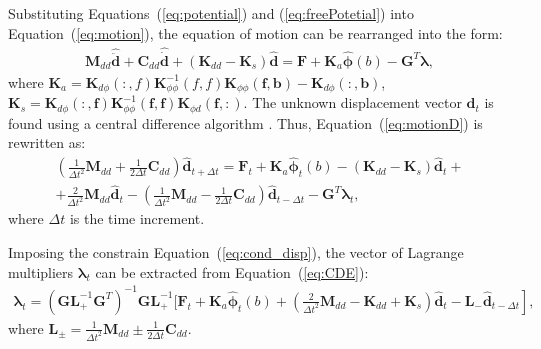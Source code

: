 \documentclass[sensors,article,accept,moreauthors,pdftex]{Definitions/mdpi}
\begin{document}
\begin{paracol}{2}
Substituting Equations~(\ref{eq:potential}) and (\ref{eq:freePotetial}) into Equation~(\ref{eq:motion}), the equation of motion can be rearranged into the form:
\begin{eqnarray}
\textbf{M}_{dd} \widehat{\ddot{\textbf{d}}} + \textbf{C}_{dd} \widehat{\dot{\textbf{d}}} + (\textbf{K}_{dd}-\textbf{K}_{s}) \widehat{\textbf{d}}  = \textbf{F} + \textbf{K}_{a} \widehat{\boldsymbol{\phi}}(b) - \textbf{G}^T \boldsymbol{\lambda},
\label{eq:motionD}
\end{eqnarray}
where  \(\textbf{K}_a=\textbf{K}_{d\phi}(:,f)\textbf{K}_{\phi \phi}^{-1}(f,f)\textbf{K}_{\phi \phi}(\textbf{f},\textbf{b})-\textbf{K}_{d\phi}(:,\textbf{b})\), \(\textbf{K}_s=\textbf{K}_{d \phi}(:,\textbf{f})\textbf{K}_{\phi \phi}^{-1}(\textbf{f},\textbf{f})\textbf{K}_{\phi d}(\textbf{f},:)\).
The unknown displacement vector \(\widehat{\textbf{d}}_t\) is found using a central difference algorithm \cite{kudela20093d}.
Thus, Equation~(\ref{eq:motionD}) is rewritten as:
\begin{equation}
\begin{array}{c}
\left(\frac{1}{\Delta t^2}\textbf{M}_{dd}+\frac{1}{2\Delta t}\textbf{C}_{dd} \right)\widehat{\textbf{d}}_{t+\Delta t}=
\textbf{F}_t+\textbf{K}_a\widehat{\boldsymbol{\phi}}_t(b)-\left( \textbf{K}_{dd}-\textbf{K}_s\right)\widehat{\textbf{d}}_t+\\
+\frac{2}{\Delta t^2}\textbf{M}_{dd}\widehat{\textbf{d}}_t-\left(\frac{1}{\Delta t^2}\textbf{M}_{dd}-\frac{1}{2\Delta t}\textbf{C}_{dd}\right)\widehat{\textbf{d}}_{t-\Delta t}-\textbf{G}^T\boldsymbol{\lambda}_t,
\end{array}
\label{eq:CDE}
\end{equation}
where \(\Delta t\) is the time increment.

Imposing the constrain Equation~(\ref{eq:cond_disp}), the vector of Lagrange multipliers \(\boldsymbol{\lambda}_t\) can be extracted from Equation~(\ref{eq:CDE}): 
\begin{eqnarray}
\boldsymbol{\lambda}_t = {\left(\textbf{G}\textbf{L}_+^{-1}\textbf{G}^T \right)}^{-1}\textbf{G}\textbf{L}_+^{-1} \Bigg[ \textbf{F}_t+\textbf{K}_a\widehat{\boldsymbol{\phi}}_t(b)+\left.\left(\frac{2}{\Delta t^2}\textbf{M}_{dd}-\textbf{K}_{dd}+\textbf{K}_s\right)\widehat{\textbf{d}}_t -\textbf{L}_-\widehat{\textbf{d}}_{t-\Delta t} \right],
\label{eq:lambda}
\end{eqnarray}
where \(\textbf{L}_{\pm}=\frac{1}{\Delta t^2}\textbf{M}_{dd}\pm\frac{1}{2\Delta t}\textbf{C}_{dd}\).

\end{paracol}
\end{document}
